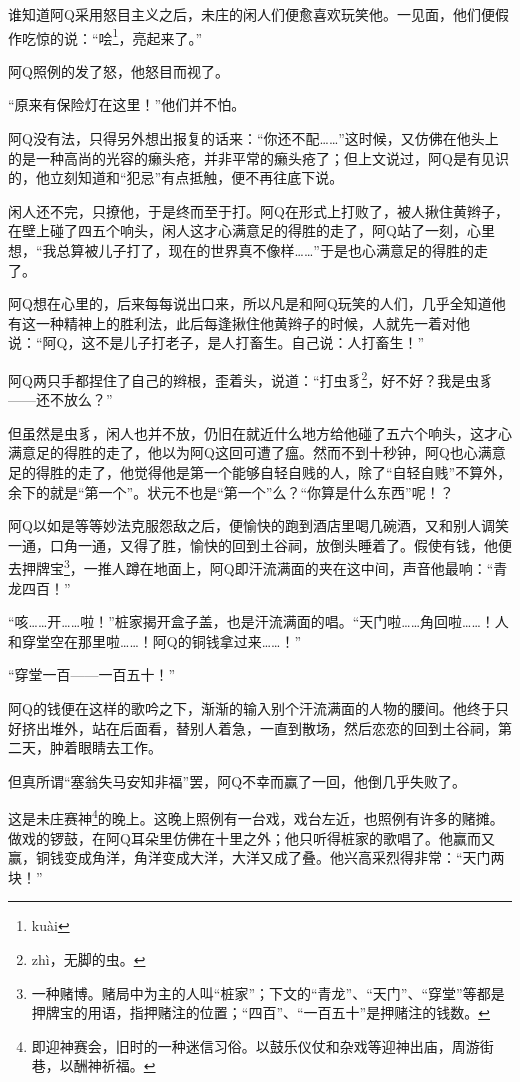 \documentclass[12pt,UTF8]{ctexbook}
\begin{document}
谁知道阿Q采用怒目主义之后，未庄的闲人们便愈喜欢玩笑他。一见面，他们便假作吃惊的说：“哙\footnote{ku\`ai}，亮起来了。”

阿Q照例的发了怒，他怒目而视了。

“原来有保险灯在这里！”他们并不怕。

阿Q没有法，只得另外想出报复的话来：“你还不配……”这时候，又仿佛在他头上的是一种高尚的光容的癞头疮，并非平常的癞头疮了；但上文说过，阿Q是有见识的，他立刻知道和“犯忌”有点抵触，便不再往底下说。

闲人还不完，只撩他，于是终而至于打。阿Q在形式上打败了，被人揪住黄辫子，在壁上碰了四五个响头，闲人这才心满意足的得胜的走了，阿Q站了一刻，心里想，“我总算被儿子打了，现在的世界真不像样……”于是也心满意足的得胜的走了。

阿Q想在心里的，后来每每说出口来，所以凡是和阿Q玩笑的人们，几乎全知道他有这一种精神上的胜利法，此后每逢揪住他黄辫子的时候，人就先一着对他说：“阿Q，这不是儿子打老子，是人打畜生。自己说：人打畜生！”

阿Q两只手都捏住了自己的辫根，歪着头，说道：“打虫豸\footnote{zh\`i，无脚的虫。}，好不好？我是虫豸——还不放么？”

但虽然是虫豸，闲人也并不放，仍旧在就近什么地方给他碰了五六个响头，这才心满意足的得胜的走了，他以为阿Q这回可遭了瘟。然而不到十秒钟，阿Q也心满意足的得胜的走了，他觉得他是第一个能够自轻自贱的人，除了“自轻自贱”不算外，余下的就是“第一个”。状元不也是“第一个”么？“你算是什么东西”呢！？

阿Q以如是等等妙法克服怨敌之后，便愉快的跑到酒店里喝几碗酒，又和别人调笑一通，口角一通，又得了胜，愉快的回到土谷祠，放倒头睡着了。假使有钱，他便去押牌宝\footnote{一种赌博。赌局中为主的人叫“桩家”；下文的“青龙”、“天门”、“穿堂”等都是押牌宝的用语，指押赌注的位置；“四百”、“一百五十”是押赌注的钱数。}，一推人蹲在地面上，阿Q即汗流满面的夹在这中间，声音他最响：“青龙四百！”

“咳……开……啦！”桩家揭开盒子盖，也是汗流满面的唱。“天门啦……角回啦……！人和穿堂空在那里啦……！阿Q的铜钱拿过来……！”

“穿堂一百——一百五十！”

阿Q的钱便在这样的歌吟之下，渐渐的输入别个汗流满面的人物的腰间。他终于只好挤出堆外，站在后面看，替别人着急，一直到散场，然后恋恋的回到土谷祠，第二天，肿着眼睛去工作。

但真所谓“塞翁失马安知非福”罢，阿Q不幸而赢了一回，他倒几乎失败了。

这是未庄赛神\footnote{即迎神赛会，旧时的一种迷信习俗。以鼓乐仪仗和杂戏等迎神出庙，周游街巷，以酬神祈福。}的晚上。这晚上照例有一台戏，戏台左近，也照例有许多的赌摊。做戏的锣鼓，在阿Q耳朵里仿佛在十里之外；他只听得桩家的歌唱了。他赢而又赢，铜钱变成角洋，角洋变成大洋，大洋又成了叠。他兴高采烈得非常：“天门两块！”
\end{document}
